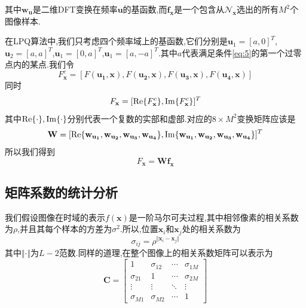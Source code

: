 \documentclass[UTF8,adobefonts]{ctexart}
\def\Re{\mathop{\rm Re}}
\def\Im{\mathop{\rm Im}}
\begin{document}
其中$\mathbf{w}_\mathbf{u}$是二维DFT变换在频率$\mathbf{u}$的基函数,而$\mathbf{f}_\mathbf{x}$是一个包含从$\mathcal{N}_\mathbf{x}$选出的所有$M^2$个图像样本.

在LPQ算法中,我们只考虑四个频率域上的基函数,它们分别是$\mathbf{u}_1 = [a,0]^T$,$\mathbf{u}_2 = [a,a]^T$,$\mathbf{u}_1 = [0,a]^T$,$\mathbf{u}_1 = [a,-a]^T$.其中$a$代表满足条件\ref{eq:5}的第一个过零点内的某点.我们令
\begin{equation}\label{eq:7}
F_\mathbf{x}^c=[F(\mathbf{u_1,x}),F(\mathbf{u_2,x}),F(\mathbf{u_3,x}),F(\mathbf{u_4,x})]
\end{equation}
同时
\begin{equation}\label{eq:8}
F_\mathbf{x}=[\Re\{F_\mathbf{x}^c\},\Im\{F_\mathbf{x}^c\}]^T
\end{equation}
其中$\Re\{\cdot\},\Im\{\cdot\}$分别代表一个复数的实部和虚部.对应的$8 \times M^2$变换矩阵应该是
\begin{equation}\label{eq:9}
\mathbf{W}=[\Re\{\mathbf{w}_\mathbf{u_1},\mathbf{w}_\mathbf{u_2},\mathbf{w}_\mathbf{u_3},\mathbf{w}_\mathbf{u_4}\},\Im\{\mathbf{w}_\mathbf{u_1},\mathbf{w}_\mathbf{u_2},\mathbf{w}_\mathbf{u_3},\mathbf{w}_\mathbf{u_4}\}]^T
\end{equation}
所以我们得到
\begin{equation}\label{eq:10}
F_\mathbf{x}=\mathbf{Wf_x}
\end{equation}


\subsection{矩阵系数的统计分析}
我们假设图像在时域的表示$f(\mathbf{x})$是一阶马尔可夫过程,其中相邻像素的相关系数为$\rho$,并且其每个样本的方差为$\sigma^2$.所以,位置$\mathbf{x}_i$和$\mathbf{x}_j$处的相关系数为
\begin{equation}\label{eq:11}
\sigma_{ij} = \rho^{\Vert \mathbf{x}_i-\mathbf{x}_j \Vert}
\end{equation}
其中$\Vert \cdot \Vert$为$L-2$范数.同样的道理,在整个图像上的相关系数矩阵可以表示为
\begin{equation}\label{eq:12}
\mathbf{C}=\begin{bmatrix}
1 & \sigma_{12}  &  \cdots  &  \sigma_{1M}\\
\sigma_{21} & 1  &  \cdots  &  \sigma_{2M}\\
\vdots & \vdots & \ddots & \vdots\\
\sigma_{M1} &  \sigma_{M2}  &  \cdots  & 1
\end{bmatrix}
\end{equation}
\end{document}
